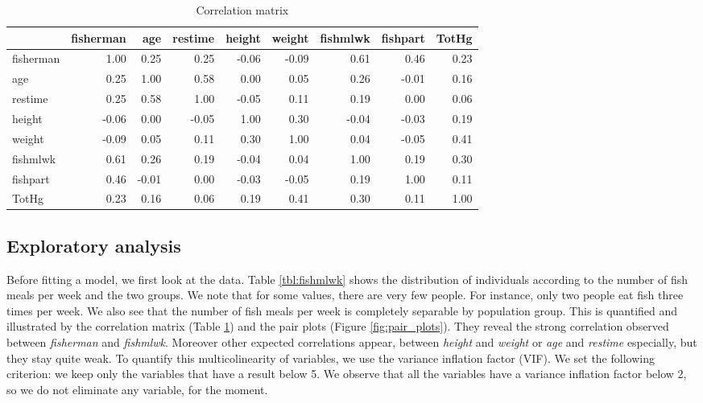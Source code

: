 \documentclass[12pt,]{article}
\begin{document}
\begin{table}[t]

\caption{\label{tab:unnamed-chunk-7}\label{tbl:correlation}Correlation matrix}
\centering
\begin{tabular}{l|r|r|r|r|r|r|r|r}
\hline
  & fisherman & age & restime & height & weight & fishmlwk & fishpart & TotHg\\
\hline
\rowcolor{gray!6}  fisherman & 1.00 & 0.25 & 0.25 & -0.06 & -0.09 & 0.61 & 0.46 & 0.23\\
\hline
age & 0.25 & 1.00 & 0.58 & 0.00 & 0.05 & 0.26 & -0.01 & 0.16\\
\hline
\rowcolor{gray!6}  restime & 0.25 & 0.58 & 1.00 & -0.05 & 0.11 & 0.19 & 0.00 & 0.06\\
\hline
height & -0.06 & 0.00 & -0.05 & 1.00 & 0.30 & -0.04 & -0.03 & 0.19\\
\hline
\rowcolor{gray!6}  weight & -0.09 & 0.05 & 0.11 & 0.30 & 1.00 & 0.04 & -0.05 & 0.41\\
\hline
fishmlwk & 0.61 & 0.26 & 0.19 & -0.04 & 0.04 & 1.00 & 0.19 & 0.30\\
\hline
\rowcolor{gray!6}  fishpart & 0.46 & -0.01 & 0.00 & -0.03 & -0.05 & 0.19 & 1.00 & 0.11\\
\hline
TotHg & 0.23 & 0.16 & 0.06 & 0.19 & 0.41 & 0.30 & 0.11 & 1.00\\
\hline
\end{tabular}
\end{table}

\subsection{Exploratory analysis}\label{exploratory-analysis}

Before fitting a model, we first look at the data. Table
\ref{tbl:fishmlwk} shows the distribution of individuals according to
the number of fish meals per week and the two groups. We note that for
some values, there are very few people. For instance, only two people
eat fish three times per week. We also see that the number of fish meals
per week is completely separable by population group. This is quantified
and illustrated by the correlation matrix (Table \ref{tbl:correlation})
and the pair plots (Figure \ref{fig:pair_plots}). They reveal the strong
correlation observed between \emph{fisherman} and \emph{fishmlwk}.
Moreover other expected correlations appear, between \emph{height} and
\emph{weight} or \emph{age} and \emph{restime} especially, but they stay
quite weak. To quantify this multicolinearity of variables, we use the
variance inflation factor (VIF). We set the following criterion: we keep
only the variables that have a result below 5. We observe that all the
variables have a variance inflation factor below 2, so we do not
eliminate any variable, for the moment.
\end{document}
